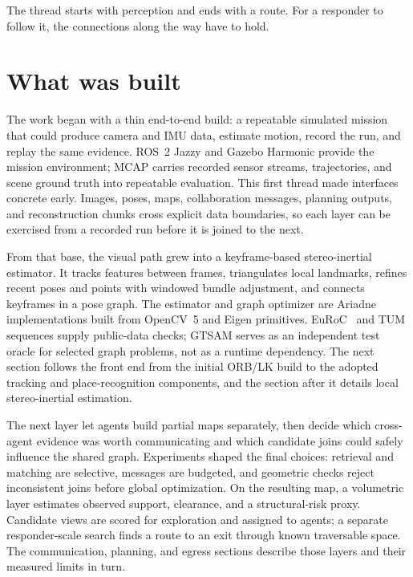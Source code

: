 \documentclass[10pt,a4paper]{article}
\begin{document}
The thread starts with perception and ends with a route. For a responder to follow it, the connections along the way have to hold.

\section{What was built}

The work began with a thin end-to-end build: a repeatable simulated mission that could produce camera and IMU data, estimate motion, record the run, and replay the same evidence. ROS~2 Jazzy and Gazebo Harmonic provide the mission environment; MCAP carries recorded sensor streams, trajectories, and scene ground truth into repeatable evaluation. This first thread made interfaces concrete early. Images, poses, maps, collaboration messages, planning outputs, and reconstruction chunks cross explicit data boundaries, so each layer can be exercised from a recorded run before it is joined to the next.

From that base, the visual path grew into a keyframe-based stereo-inertial estimator. It tracks features between frames, triangulates local landmarks, refines recent poses and points with windowed bundle adjustment, and connects keyframes in a pose graph. The estimator and graph optimizer are Ariadne implementations built from OpenCV~5 and Eigen primitives. EuRoC~\cite{euroc} and TUM sequences supply public-data checks; GTSAM serves as an independent test oracle for selected graph problems, not as a runtime dependency. The next section follows the front end from the initial ORB/LK build to the adopted tracking and place-recognition components, and the section after it details local stereo-inertial estimation.

The next layer let agents build partial maps separately, then decide which cross-agent evidence was worth communicating and which candidate joins could safely influence the shared graph. Experiments shaped the final choices: retrieval and matching are selective, messages are budgeted, and geometric checks reject inconsistent joins before global optimization. On the resulting map, a volumetric layer estimates observed support, clearance, and a structural-risk proxy. Candidate views are scored for exploration and assigned to agents; a separate responder-scale search finds a route to an exit through known traversable space. The communication, planning, and egress sections describe those layers and their measured limits in turn.
\end{document}
